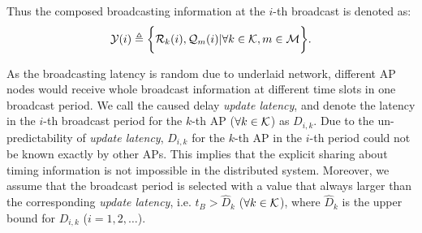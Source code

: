 
Thus the composed broadcasting information at the $i$-th broadcast is denoted as:
\begin{align}
    \mathcal{Y}(i) \triangleq
        \bigg\{
            \mathcal{R}_{k}(i), \mathcal{Q}_{m}(i) | \forall k\in\mathcal{K}, m\in\mathcal{M}
        \bigg\}.
\end{align}

As the broadcasting latency is random due to underlaid network, different AP nodes would receive whole broadcast information at different time slots in one broadcast period.
We call the caused delay \emph{update latency}, and denote the latency in the $i$-th broadcast period for the $k$-th AP ($\forall k\in\mathcal{K}$) as $D_{i,k}$.
Due to the un-predictability of \emph{update latency}, $D_{i,k}$ for the $k$-th AP in the $i$-th period could not be known exactly by other APs. This implies that the explicit sharing about timing information is not impossible in the distributed system.
Moreover, we assume that the broadcast period is selected with a value that always larger than the corresponding \emph{update latency}, i.e. $t_B > \hat{D}_k$ ($\forall k\in\mathcal{K}$), where $\hat{D}_k$ is the upper bound for $D_{i,k}$ ($i=1,2,\dots$).

